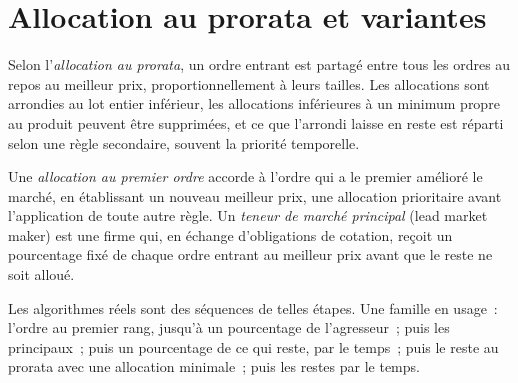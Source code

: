 \section{Allocation au prorata et variantes}

\begin{definition}\label{def:m1:matching-algorithms-and-implied-spreads:prorata}
Selon l'\emph{allocation au prorata}, un ordre entrant
est partagé entre tous les ordres au repos au meilleur prix, proportionnellement à leurs
tailles. Les allocations sont arrondies au lot entier inférieur, les allocations inférieures à un
minimum propre au produit peuvent être supprimées, et ce que l'arrondi laisse en reste est
réparti selon une règle secondaire, souvent la priorité temporelle.
\end{definition}

\begin{definition}\label{def:m1:matching-algorithms-and-implied-spreads:top}
Une \emph{allocation au premier ordre} accorde à l'ordre qui a
le premier amélioré le marché, en établissant un nouveau meilleur prix, une allocation prioritaire
avant l'application de toute autre règle. Un \emph{teneur de marché
principal} (lead market maker) est une firme qui, en échange
d'obligations de cotation, reçoit un pourcentage fixé de chaque ordre entrant au meilleur
prix avant que le reste ne soit alloué.
\end{definition}

Les algorithmes réels sont des séquences de telles étapes. Une famille en usage~: l'ordre
au premier rang, jusqu'à un pourcentage de l'agresseur~; puis les  principaux~;
puis un pourcentage de ce qui reste, par le temps~; puis le reste au prorata avec une
allocation minimale~; puis les restes par le temps.

